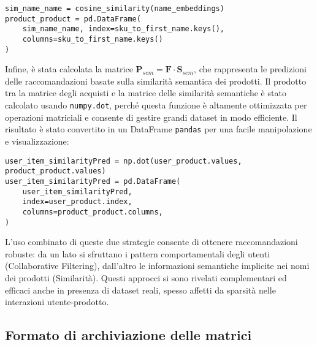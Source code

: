 \begin{verbatim}
sim_name_name = cosine_similarity(name_embeddings)
product_product = pd.DataFrame(
    sim_name_name, index=sku_to_first_name.keys(),
    columns=sku_to_first_name.keys()
)
\end{verbatim}

Infine, è stata calcolata la matrice $\mathbf{P}_{sem} = \mathbf{F} \cdot \mathbf{S}_{sem}$, che rappresenta le predizioni delle raccomandazioni basate sulla similarità semantica dei prodotti. Il prodotto tra la matrice degli acquisti e la matrice delle similarità semantiche è stato calcolato usando \texttt{numpy.dot}, perché questa funzione è altamente ottimizzata per operazioni matriciali e consente di gestire grandi dataset in modo efficiente. Il risultato è stato convertito in un DataFrame \texttt{pandas} per una facile manipolazione e visualizzazione:

\begin{verbatim}
user_item_similarityPred = np.dot(user_product.values,
product_product.values)
user_item_similarityPred = pd.DataFrame(
    user_item_similarityPred,
    index=user_product.index,
    columns=product_product.columns,
)
\end{verbatim}

\medskip

L’uso combinato di queste due strategie consente di ottenere raccomandazioni robuste: da un lato si sfruttano i pattern comportamentali degli utenti (Collaborative Filtering), dall’altro le informazioni semantiche implicite nei nomi dei prodotti (Similarità). Questi approcci si sono rivelati complementari ed efficaci anche in presenza di dataset reali, spesso affetti da sparsità nelle interazioni utente-prodotto.


\subsection{Formato di archiviazione delle matrici}

